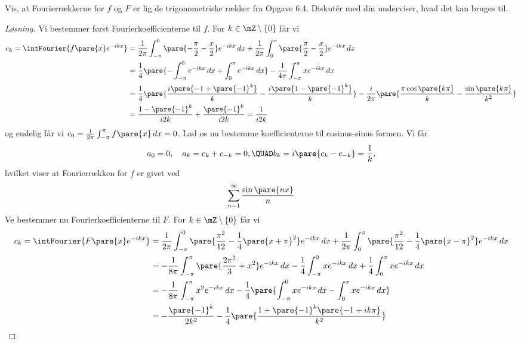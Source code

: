 \begin{opg}[Fourierrækker II]
\begin{enumerate}
	Vis, at Fourierrækkerne for $f$ og $F$ er lig de trigonometriske rækker fra Opgave 6.4. Diskutér med din underviser, hvad det kan bruges til.
	
	\iffalse\begin{proof}[Løsning]
	Vi bestemmer først Fourierkoefficienterne til $f$. For $k\in\mZ\setminus\{0\}$ får vi
	\begin{align*}
	    c_k = \intFourier{f\pare{x}e^{-ikx}}
	        &= \frac{1}{2\pi}\int_{-\pi}^0 \pare{-\frac{\pi}{2}
	                - \frac{x}{2}}e^{-ikx} \, dx
	            + \frac{1}{2\pi}\int_0^\pi \pare{\frac{\pi}{2}-\frac{x}{2}}e^{-ikx} \, dx \\
	        &= \frac{1}{4}\pare{-\int_{-\pi}^0e^{-ikx} \, dx
	            + \int_0^\pi e^{-ikx} \, dx}
	            -\frac{1}{4\pi} \int_{-\pi}^\pi xe^{-ikx} \, dx \\
	        &= \frac{1}{4}\pare{\frac{i\pare{-1+\pare{-1}^k}}{k} - \frac{i\pare{1-\pare{-1}^k}}{k}}-\frac{i}{2\pi}\pare{\frac{\pi\cos\pare{k\pi}}{k} - \frac{\sin\pare{k\pi}}{k^2}} \\
	        &= \frac{1 - \pare{-1}^k}{i2k} + \frac{\pare{-1}^k}{i2k} 
	            = \frac{1}{i2k}
	\end{align*}
	og endelig får vi $c_0 = \frac{1}{2\pi}\int_{-\pi}^\pi f\pare{x} \, dx = 0$. Lad os nu bestemme koefficienterne til cosinus-sinus formen. Vi får
	$$ a_0 = 0, \quad a_k = c_k + c_{-k} = 0, \QUAD
	    b_k = i\pare{c_k - c_{-k}} = \frac{1}{k}, $$
	hvilket viser at Fourierrækken for $f$ er givet ved 
	$$ \sum_{n=1}^\infty \frac{\sin\pare{nx}}{n} $$
	Ve bestemmer nu Fourierkoefficienterne til $F$. For $k\in\mZ\setminus\{0\}$ får vi
	\begin{align*}
	    c_k = \intFourier{F\pare{x}e^{-ikx}}
            &= \frac{1}{2\pi}\int_{-\pi}^0 \pare{\frac{\pi^2}{12}
                    - \frac{1}{4}\pare{x+\pi}^2}e^{-ikx} \, dx
                + \frac{1}{2\pi}\int_0^\pi \pare{\frac{\pi^2}{12}
                    - \frac{1}{4}\pare{x-\pi}^2}e^{-ikx} \, dx \\
            &= -\frac{1}{8\pi}\int_{-\pi}^\pi
                    \pare{\frac{2\pi^2}{3} + x^2}e^{-ikx} \, dx
                - \frac{1}{4}\int_{-\pi}^0 xe^{-ikx} \, dx
                + \frac{1}{4}\int_0^\pi xe^{-ikx} \, dx \\
            &= -\frac{1}{8\pi}\int_{-\pi}^\pi
                    x^2e^{-ikx} \, dx
                - \frac{1}{4}\pare{\int_{-\pi}^0 xe^{-ikx} \, dx
                - \int_0^\pi xe^{-ikx} \, dx} \\
            &= -\frac{\pare{-1}^k}{2k^2} - \frac{1}{4}\pare{\frac{1+\pare{-1}^k\pare{-1+ik\pi}}{k^2}
}
\end{align*}
\end{proof}
\end{enumerate}
\end{opg}
